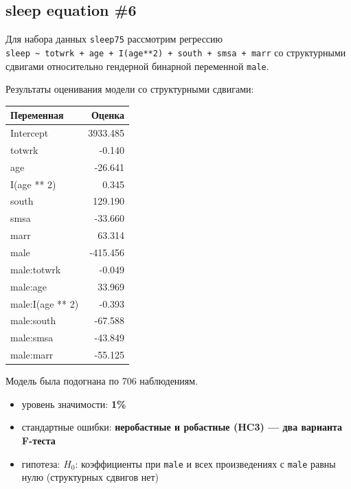 \documentclass[
  russian,
]{article}
\newcounter{none} %
\providecommand{\tightlist}{%
  \setlength{\itemsep}{0pt}\setlength{\parskip}{0pt}}
\begin{document}
\subsection{sleep equation \#6}\label{sleep-equation-6}

Для набора данных \texttt{sleep75} рассмотрим регрессию
\texttt{sleep\ \textasciitilde{}\ totwrk\ +\ age\ +\ I(age**2)\ +\ south\ +\ smsa\ +\ marr}
со структурными сдвигами относительно гендерной бинарной переменной
\texttt{male}.

Результаты оценивания модели со структурными сдвигами:

{\def\LTcaptype{none} %
\begin{longtable}[]{@{}lr@{}}
\toprule\noalign{}
Переменная & Оценка \\
\midrule\noalign{}
\endhead
\bottomrule\noalign{}
\endlastfoot
Intercept & 3933.485 \\
totwrk & -0.140 \\
age & -26.641 \\
I(age ** 2) & 0.345 \\
south & 129.190 \\
smsa & -33.660 \\
marr & 63.314 \\
male & -415.456 \\
male:totwrk & -0.049 \\
male:age & 33.969 \\
male:I(age ** 2) & -0.393 \\
male:south & -67.588 \\
male:smsa & -43.849 \\
male:marr & -55.125 \\
\end{longtable}
}

Модель была подогнана по 706 наблюдениям.

\begin{tcolorbox}[enhanced jigsaw, arc=.35mm, bottomrule=.15mm, bottomtitle=1mm, breakable, colback=white, colbacktitle=quarto-callout-important-color!10!white, colframe=quarto-callout-important-color-frame, coltitle=black, left=2mm, leftrule=.75mm, opacityback=0, opacitybacktitle=0.6, rightrule=.15mm, title=\textcolor{quarto-callout-important-color}{\faExclamation}\hspace{0.5em}{Условия теста}, titlerule=0mm, toprule=.15mm, toptitle=1mm]

\begin{itemize}
\tightlist
\item
  уровень значимости: \textbf{1\%}
\item
  стандартные ошибки: \textbf{неробастные и робастные (HC3) --- два
  варианта F-теста}
\item
  гипотеза: \(H_0\): коэффициенты при \texttt{male} и всех произведениях
  с \texttt{male} равны нулю (структурных сдвигов нет)
\end{itemize}

\end{tcolorbox}
\end{document}
